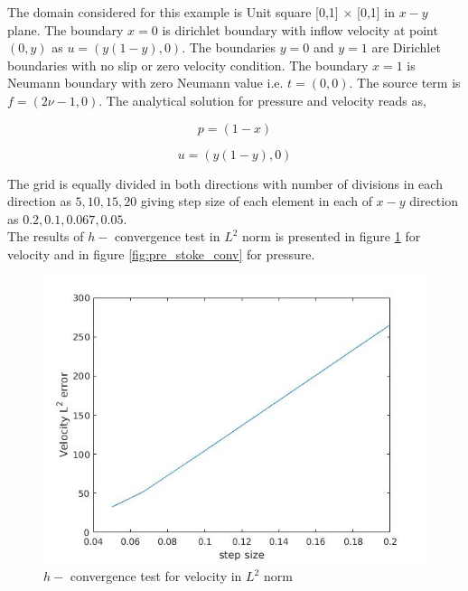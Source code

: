 \documentclass[a4paper,12pt]{book}
\begin{document}
The domain considered for this example is Unit square [0,1] $\times$ [0,1] in $x-y$ plane. 
The boundary ${x=0}$ is dirichlet boundary with inflow velocity at point $(0,y)$ as $u = (y(1-y), 0)$. The boundaries ${y = 0}$ and ${y = 1}$ are Dirichlet boundaries with no slip or zero velocity condition. The boundary ${x = 1}$ is Neumann boundary with zero Neumann value i.e. $t = (0, 0)$. The source term is $f = (2 \nu - 1, 0)$. The analytical solution for pressure and velocity reads as,

\begin{center}

\begin{equation}
p = (1 - x)
\end{equation}

\begin{equation} 
 u = (y(1-y), 0)
\end{equation}

\end{center}

The grid is equally divided in both directions with number of divisions in each direction as $5,10,15,20$ giving step size of each element in each of $x-y$ direction as $0.2,0.1,0.067,0.05$.\\

The results of $h-$ convergence test in $L^2$ norm is presented in figure \ref{fig:vel_stoke_conv} for velocity and in figure \ref{fig:pre_stoke_conv} for pressure. \\

\begin{figure}
  \includegraphics[width=\linewidth]{velocity_error_stokes.jpg}
  \caption{$h-$ convergence test for velocity in $L^2$ norm}
  \label{fig:vel_stoke_conv}
\end{figure}
\end{document}
